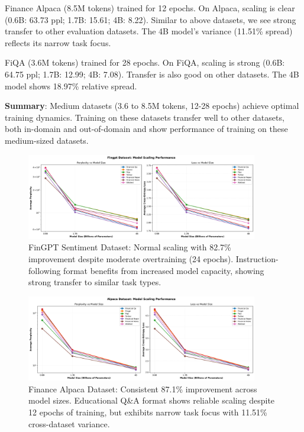 Finance Alpaca (8.5M tokens) trained for 12 epochs. On Alpaca, scaling is clear (0.6B: 63.73 ppl; 1.7B: 15.61; 4B: 8.22). Similar to above datasets, we see strong transfer to other evaluation datasets. The 4B model's variance (11.51\% spread) reflects its narrow task focus.

FiQA (3.6M tokens) trained for 28 epochs. On FiQA, scaling is strong (0.6B: 64.75 ppl; 1.7B: 12.99; 4B: 7.08). Transfer is also good on other datasets. The 4B model shows 18.97\% relative spread.

\textbf{Summary}: Medium datasets (3.6 to 8.5M tokens, 12-28 epochs) achieve optimal training dynamics. Training on these datasets transfer well to other datasets, both in-domain and out-of-domain  and  show performance of training on these medium-sized datasets.

\begin{figure}[htbp]
\centering
\includegraphics[width=0.9\textwidth]{figures/scaling_fingpt.png}
\caption[FinGPT Sentiment Dataset: Scaling Behavior]{FinGPT Sentiment Dataset: Normal scaling with 82.7\% improvement despite moderate overtraining (24 epochs). Instruction-following format benefits from increased model capacity, showing strong transfer to similar task types.}
\label{fig:scaling_fingpt}
\end{figure}

\begin{figure}[htbp]
\centering
\includegraphics[width=0.9\textwidth]{figures/scaling_alpaca.png}
\caption[Finance Alpaca Dataset: Scaling Behavior]{Finance Alpaca Dataset: Consistent 87.1\% improvement across model sizes. Educational Q\&A format shows reliable scaling despite 12 epochs of training, but exhibits narrow task focus with 11.51\% cross-dataset variance.}
\label{fig:scaling_alpaca}
\end{figure}

